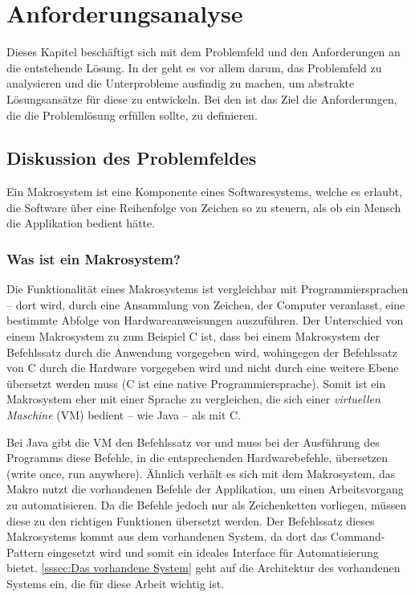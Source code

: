 \section{An\-for\-de\-rungs\-ana\-ly\-se}
\label{sec:Anforderungsanalyse}
  Dieses Kapitel beschäftigt sich mit dem Problemfeld und den Anforderungen an die entstehende Lösung. In der  geht es vor allem darum, das Problemfeld zu analysieren und die Unterprobleme ausfindig zu machen, um abstrakte Lösungsansätze für diese zu entwickeln. Bei den  ist das Ziel die Anforderungen, die die Problemlösung erfüllen sollte, zu definieren.

  \subsection{Diskussion des Problemfeldes}
  \label{ssec:Diskussion des Problemfeldes}
    Ein Makrosystem ist eine Komponente eines Softwaresystems, welche es erlaubt, die Software über eine Reihenfolge von Zeichen so zu steuern, als ob ein Mensch die Applikation bedient hätte.

    \subsubsection{Was ist ein Makrosystem?}
    \label{sssec:Was ist ein Makrosystem?}
      Die Funktionalität eines Makrosystems ist vergleichbar mit Programmiersprachen -- dort wird, durch eine Ansammlung von Zeichen, der Computer veranlasst, eine bestimmte Abfolge von Hardwareanweisungen auszuführen. Der Unterschied von einem Makrosystem zu zum Beispiel C ist, dass bei einem Makrosystem der Befehlssatz durch die Anwendung vorgegeben wird, wohingegen der Befehlssatz von C durch die Hardware vorgegeben wird und nicht durch eine weitere Ebene übersetzt werden muss (C ist eine native Programmiersprache). Somit ist ein Makrosystem eher mit einer Sprache zu vergleichen, die sich einer \emph{virtuellen Maschine} (VM) bedient -- wie Java -- als mit C.

      Bei Java gibt die VM den Befehlssatz vor und muss bei der Ausführung des Programms diese Befehle, in die entsprechenden Hardwarebefehle, übersetzen (write once, run anywhere). Ähnlich verhält es sich mit dem Makrosystem, das Makro nutzt die vorhandenen Befehle der Applikation, um einen Arbeitsvorgang zu automatisieren. Da die Befehle jedoch nur als Zeichenketten vorliegen, müssen diese zu den richtigen Funktionen übersetzt werden. Der Befehlssatz dieses Makrosystems kommt aus dem vorhandenen System, da dort das Command-Pattern \autocite[S.263]{Gamma:1995:DPE:186897} eingesetzt wird und somit ein ideales Interface für Automatisierung bietet. \autoref{sssec:Das vorhandene System} geht auf die Architektur des vorhandenen Systems ein, die für diese Arbeit wichtig ist.

